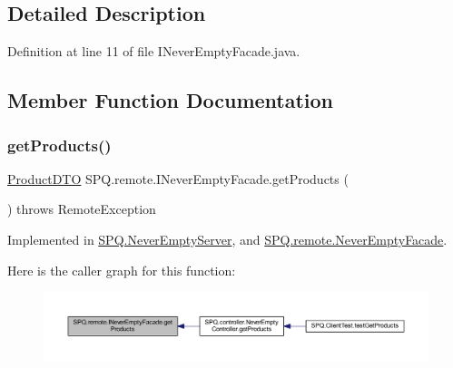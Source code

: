 \subsection{Detailed Description}


Definition at line 11 of file I\+Never\+Empty\+Facade.\+java.



\subsection{Member Function Documentation}
\mbox{\label{interface_s_p_q_1_1remote_1_1_i_never_empty_facade_a62d4a1747b8ba90f451fc9f9343055f3}} 
\subsubsection{\texorpdfstring{get\+Products()}{getProducts()}}
{\footnotesize\ttfamily \mbox{\hyperlink{class_s_p_q_1_1dto_1_1_product_d_t_o}{Product\+D\+TO}} S\+P\+Q.\+remote.\+I\+Never\+Empty\+Facade.\+get\+Products (\begin{DoxyParamCaption}{ }\end{DoxyParamCaption}) throws Remote\+Exception}



Implemented in \mbox{\hyperlink{class_s_p_q_1_1_never_empty_server_ad8c5a0afa259c6b8bcc2eb2444742ca2}{S\+P\+Q.\+Never\+Empty\+Server}}, and \mbox{\hyperlink{class_s_p_q_1_1remote_1_1_never_empty_facade_a4c8bdeeb3d2c3eb2c28aec1043e9274f}{S\+P\+Q.\+remote.\+Never\+Empty\+Facade}}.

Here is the caller graph for this function\+:
\nopagebreak
\begin{figure}[H]
\begin{center}
\leavevmode
\includegraphics[width=350pt]{interface_s_p_q_1_1remote_1_1_i_never_empty_facade_a62d4a1747b8ba90f451fc9f9343055f3_icgraph}
\end{center}
\end{figure}
\mbox{\label{interface_s_p_q_1_1remote_1_1_i_never_empty_facade_aa329dfc23ab0832e73802bf2df90b9e0}} 
